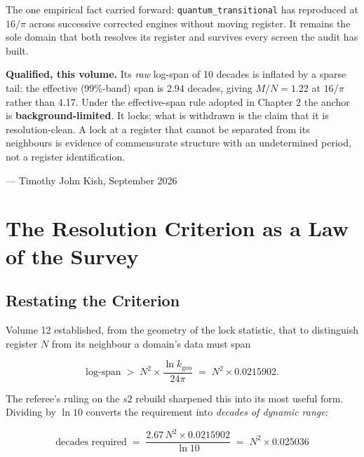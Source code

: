\documentclass[11pt, letterpaper, openany]{book}
\newcommand{\kgeo}{k_{\mathrm{geo}}}
\newcommand{\MN}{M/N}
\begin{document}
\begin{signalbox}
The one empirical fact carried forward: \texttt{quantum\_transitional} has reproduced at $16/\pi$
across successive corrected engines without moving register. It remains the sole domain that both
resolves its register and survives every screen the audit has built.

\medskip
\textbf{Qualified, this volume.} Its \emph{raw} log-span of 10 decades is inflated by a sparse tail:
the effective (99\%-band) span is 2.94 decades, giving $\MN = 1.22$ at $16/\pi$ rather than 4.17.
Under the effective-span rule adopted in Chapter 2 the anchor is \textbf{background-limited}. It
locks; what is withdrawn is the claim that it is resolution-clean. A lock at a register that cannot
be separated from its neighbours is evidence of commensurate structure with an undetermined period,
not a register identification.
\end{signalbox}

\vspace{1em}
\noindent\hfill --- Timothy John Kish, September 2026

\chapter{The Resolution Criterion as a Law of the Survey}

\section{Restating the Criterion}

Volume 12 established, from the geometry of the lock statistic, that to distinguish register
$N$ from its neighbour a domain's data must span

\begin{equation}
\text{log-span} \;>\; N^2 \times \frac{\ln \kgeo}{24\pi} \;=\; N^2 \times 0.0215902 .
\label{eq:res}
\end{equation}

The referee's ruling on the $s2$ rebuild sharpened this into its most useful form. Dividing by
$\ln 10$ converts the requirement into \emph{decades of dynamic range}:

\begin{equation}
\boxed{\ \text{decades required} \;=\; \frac{2.67\, N^2 \times 0.0215902}{\ln 10}
\;=\; N^2 \times 0.025036\ }
\label{eq:decades}
\end{equation}
\end{document}
